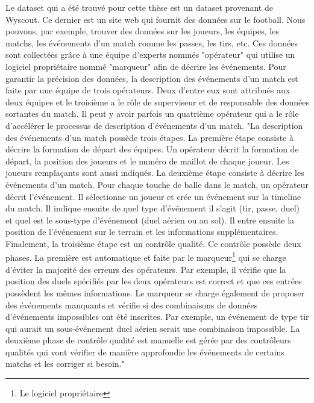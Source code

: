 \documentclass[12pt]{article}
\begin{document}
Le dataset qui a été trouvé pour cette thèse est un dataset provenant de Wyscout.
Ce dernier est un site web qui fournit des données sur le football.
Nous pouvons, par exemple, trouver des données sur les joueurs, les équipes, les matchs, les événements d'un match comme les passes, les tirs, etc.
Ces données sont collectées grâce à une équipe d'experts nommés "opérateur" qui utilise un logiciel propriétaire nommé "marqueur" afin de décrire les événements.
Pour garantir la précision des données, la description des événements d'un match est faite par une équipe de trois opérateurs.
Deux d'entre eux sont attribués aux deux équipes et le troisième a le rôle de superviseur et de responsable des données sortantes du match. \cite{pappalardoPublicDataSet2019}
Il peut y avoir parfois un quatrième opérateur qui a le rôle d'accélérer le processus de description d'événements d'un match.
\newline\newline
"La description des événements d'un match possède trois étapes.
La première étape consiste à décrire la formation de départ des équipes.
Un opérateur décrit la formation de départ, la position des joueurs et le numéro de maillot de chaque joueur. Les joueurs remplaçants sont aussi indiqués.
La deuxième étape consiste à décrire les événements d'un match.
Pour chaque touche de balle dans le match, un opérateur décrit l'événement.
Il sélectionne un joueur et crée un événement sur la timeline du match.
Il indique ensuite de quel type d'événement il s'agit (tir, passe, duel) et quel est le sous-type d'événement (duel aérien ou au sol).
Il entre ensuite la position de l'événement sur le terrain et les informations supplémentaires.
Finalement, la troisième étape est un contrôle qualité.
Ce contrôle possède deux phases.
La première est automatique et faite par le marqueur\footnote{Le logiciel propriétaire} qui se charge d'éviter la majorité des erreurs des opérateurs.
Par exemple, il vérifie que la position des duels spécifiés par les deux opérateurs est correct et que ces entrées possèdent les mêmes informations.
Le marqueur se charge également de proposer des événements manquants et vérifie si des combinaisons de données d'événements impossibles ont été inscrites.
Par exemple, un événement de type tir qui aurait un sous-événement duel aérien serait une combinaison impossible.
La deuxième phase de contrôle qualité est manuelle est gérée par des contrôleurs qualités qui vont vérifier de manière approfondie les événements de certains matchs et les corriger si besoin." \cite{pappalardoPublicDataSet2019}
\end{document}
